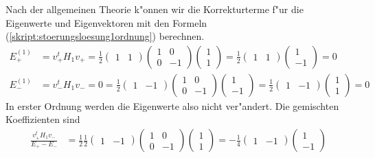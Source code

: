 \begin{loesung}
Nach der allgemeinen Theorie k"onnen wir die Korrekturterme f"ur die
Eigenwerte und Eigenvektoren mit den Formeln
(\ref{skript:stoerungsloesung1ordnung}) berechnen.
\begin{align*}
E_+^{(1)}&=v_+^tH_1v_+
	=\frac12\begin{pmatrix}1&1\end{pmatrix}
		\begin{pmatrix}1&0\\0&-1\end{pmatrix}
		\begin{pmatrix}1\\1\end{pmatrix}
	=\frac12\begin{pmatrix}1&1\end{pmatrix}
		\begin{pmatrix}1\\-1\end{pmatrix}
	=0
\\
E_-^{(1)}&=v_-^tH_1v_-=0
	=\frac12\begin{pmatrix}1&-1\end{pmatrix}
		\begin{pmatrix}1&0\\0&-1\end{pmatrix}
		\begin{pmatrix}1\\-1\end{pmatrix}
	=\frac12\begin{pmatrix}1&-1\end{pmatrix}
		\begin{pmatrix}1\\1\end{pmatrix}
	=0
\end{align*}
In erster Ordnung werden die Eigenwerte also nicht ver"andert.
Die gemischten Koeffizienten sind
\begin{align*}
\frac{v_+^tH_1v_-}{E_+-E_-}
&=
\frac{1}{2}
\frac12
	\begin{pmatrix}1&-1\end{pmatrix}
	\begin{pmatrix}1&0\\0&-1\end{pmatrix}
	\begin{pmatrix}1\\1\end{pmatrix}
=
-\frac14
	\begin{pmatrix}1&-1\end{pmatrix}
	\begin{pmatrix}1\\-1\end{pmatrix}

\end{align*}
\end{loesung}
